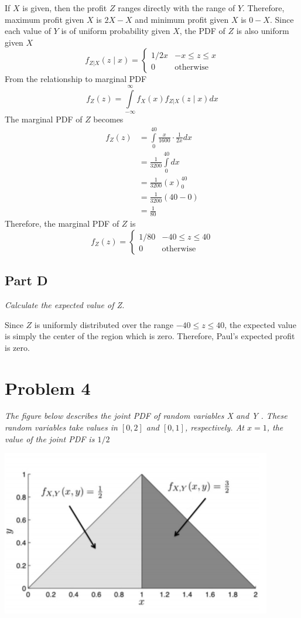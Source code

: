 \documentclass{article}
\begin{document}
If $X$ is given, then the profit $Z$ ranges directly with the range of $Y$.
Therefore, maximum profit given $X$ is $2X - X$ and minimum profit given $X$
is $0 - X$. Since each value of $Y$ is of uniform probability given $X$, the
PDF of $Z$ is also uniform given $X$
$$ f_{Z|X}(z \mid x) = \begin{cases}
    1 / 2x & -x \leq z \leq x \\
    0 & \mathrm{otherwise}
\end{cases} $$
From the relationship to marginal PDF
$$ f_Z(z) = \int\limits_{-\infty}^\infty f_X(x) f_{Z|X}(z \mid x) dx $$
The marginal PDF of $Z$ becomes
\begin{align*} f_Z(z) &= \int\limits_0^{40} \frac{x}{1600} \cdot \frac{1}{2x} dx \\
    &= \frac{1}{3200} \int\limits_0^{40} dx \\
    &= \frac{1}{3200} \left(x \right)_0^{40} \\
    &= \frac{1}{3200} \left(40 - 0 \right) \\
    &= \frac{1}{80}
\end{align*}
Therefore, the marginal PDF of $Z$ is
$$ f_Z(z) = \begin{cases}
    1/80 & -40 \leq z \leq 40 \\
    0 & \mathrm{otherwise}
\end{cases} $$

\subsection*{Part D}

\textit{Calculate the expected value of Z.}

\bigbreak

Since $Z$ is uniformly distributed over the range $ -40 \leq z \leq 40 $, the
expected value is simply the center of the region which is zero. Therefore,
Paul's expected profit is zero.

\section*{Problem 4}

\textit{The figure below describes the joint PDF of random variables X and Y
. These random variables take values in $[0, 2]$ and $[0, 1]$, respectively.
At $x = 1$, the value of the joint PDF is $1/2$}

\begin{center}
    \includegraphics[scale=1]{Images/P4.PNG}
\end{center}
\end{document}
